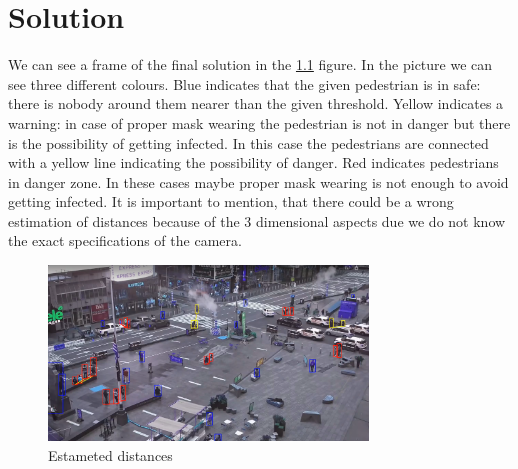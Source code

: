 \chapter{Solution}

We can see a frame of the final solution in the \ref{fig:distance} figure. In the picture we can see three different colours. Blue indicates that the given pedestrian is in safe: there is nobody around them nearer than the given threshold. Yellow indicates a warning: in case of proper mask wearing the pedestrian is not in danger but there is the possibility of getting infected. In this case the pedestrians are connected with a yellow line indicating the possibility of danger. Red indicates pedestrians in danger zone. In these cases maybe proper mask wearing is not enough to avoid getting infected. It is important to mention, that there could be a wrong estimation of distances because of the 3 dimensional aspects due we do not know the exact specifications of the camera.

\begin{figure}[!ht]
\centering
\includegraphics[width=85mm,keepaspectratio]{fig/distance_on_image.png}
\caption{Estameted distances}
\label{fig:distance} 
\end{figure}

